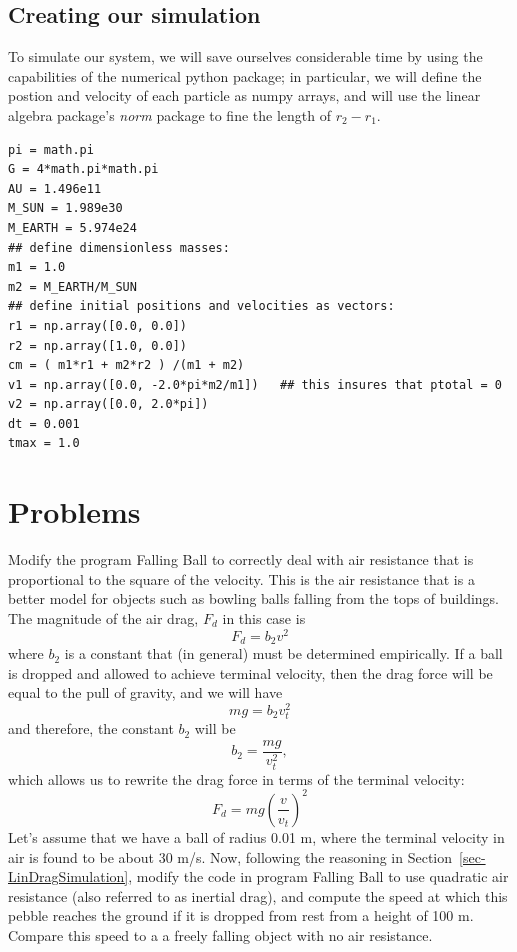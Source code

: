 \subsection{Creating our simulation}
\label{subsec:twoBody}

To simulate our system, we will save ourselves considerable time by using the capabilities of the numerical python package; in particular, we will define the postion and velocity of each particle as numpy arrays, and will use the linear algebra package's \textit{norm} package to fine the length of $r_2 - r_1$.

\begin{lstlisting}[frame=none, style = pythonSnippet]
pi = math.pi
G = 4*math.pi*math.pi
AU = 1.496e11
M_SUN = 1.989e30
M_EARTH = 5.974e24
## define dimensionless masses:
m1 = 1.0
m2 = M_EARTH/M_SUN
## define initial positions and velocities as vectors:
r1 = np.array([0.0, 0.0])
r2 = np.array([1.0, 0.0])
cm = ( m1*r1 + m2*r2 ) /(m1 + m2)
v1 = np.array([0.0, -2.0*pi*m2/m1])   ## this insures that ptotal = 0
v2 = np.array([0.0, 2.0*pi])
dt = 0.001
tmax = 1.0

\end{lstlisting}




\pagebreak

\section*{Problems}
%

\begin{prob}
\label{prob2.1}
Modify the program \textsf{Falling Ball} to correctly deal with air resistance that is proportional to the square of the velocity. This is the air resistance that is a better model for objects such as bowling balls falling from the tops of buildings.  
The magnitude of the air drag, $F_d$ in this case is 
$$ F_d = b_2 v^2 $$
where $b_2$ is a constant that (in general) must be determined empirically. If a ball is dropped and allowed to achieve terminal velocity, then the drag force will be equal to the pull of gravity, and we will have
$$ mg = b_2 v_{t}^2$$
and therefore, the constant $b_2$ will be 
$$ b_2 = \frac{mg}{v_{t}^2},$$
which allows us to rewrite the drag force in terms of the terminal velocity:
$$ F_d = mg \left(\frac{v}{v_t}\right)^2 $$
Let's assume that we have a ball of radius 0.01 m, where the terminal velocity in air is found to be about 30 m/s. Now, following the reasoning in Section~\ref{sec-LinDragSimulation}, modify the code in program \textsf{Falling Ball} to use quadratic air resistance (also referred to as inertial drag), and compute the speed at which this pebble reaches the ground if it is dropped from rest from a height of 100 m. Compare this speed to a a freely falling object with no air resistance. 
\end{prob}

